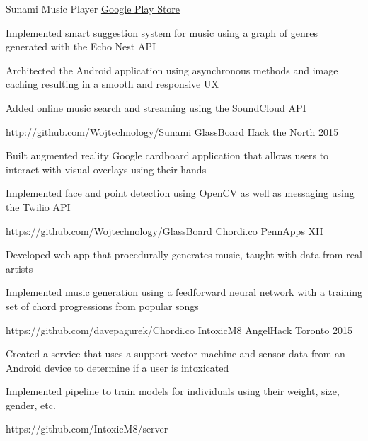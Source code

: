 \begin{cvprojects}
  \cvproject
    {Sunami Music Player}
    {\href{http://play.google.com/store/apps/details?id=com.wojtechnology.sunami}{Google Play Store}}
    {
      \begin{cvitems}
        \item Implemented smart suggestion system for music using a graph of genres generated with the Echo Nest API
        \item Architected the Android application using asynchronous methods and image caching resulting in a smooth and responsive UX
        \item Added online music search and streaming using the SoundCloud API
      \end{cvitems}
    }
    {http://github.com/Wojtechnology/Sunami}
  \cvproject
    {GlassBoard}
    {Hack the North 2015}
    {
      \begin{cvitems}
        \item Built augmented reality Google cardboard application that allows users to interact with visual overlays using their hands
        \item Implemented face and point detection using OpenCV as well as messaging using the Twilio API
      \end{cvitems}
    }
    {https://github.com/Wojtechnology/GlassBoard}
  \cvproject
    {Chordi.co}
    {PennApps XII}
    {
      \begin{cvitems}
        \item Developed web app that procedurally generates music, taught with data from real artists
        \item Implemented music generation using a feedforward neural network with a training set of chord progressions from popular songs
      \end{cvitems}
    }
    {https://github.com/davepagurek/Chordi.co}
  \cvproject
    {IntoxicM8}
    {AngelHack Toronto 2015}
    {
      \begin{cvitems}
        \item Created a service that uses a support vector machine and sensor data from an Android device to determine if a user is intoxicated
        \item Implemented pipeline to train models for individuals using their weight, size, gender, etc.
      \end{cvitems}
    }
    {https://github.com/IntoxicM8/server}
\end{cvprojects}
